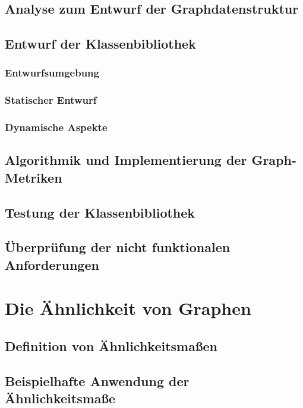 \documentclass[a4paper,12pt,ngerman,chapterprefix=false,listof=totoc,bibliography=totoc]{scrreprt}
\begin{document}
{{\section{Analyse zum Entwurf der Graphdatenstruktur}

\section{Entwurf der Klassenbibliothek}

\subsection{Entwurfsumgebung}

\subsection{Statischer Entwurf}

\subsection{Dynamische Aspekte}

\section{Algorithmik und Implementierung der Graph-Metriken}

\section{Testung der Klassenbibliothek}

\section{Überprüfung der nicht funktionalen Anforderungen}

\chapter{Die Ähnlichkeit von Graphen}

\section{Definition von Ähnlichkeitsmaßen}

\section{Beispielhafte Anwendung der Ähnlichkeitsmaße}

}}
\end{document}
